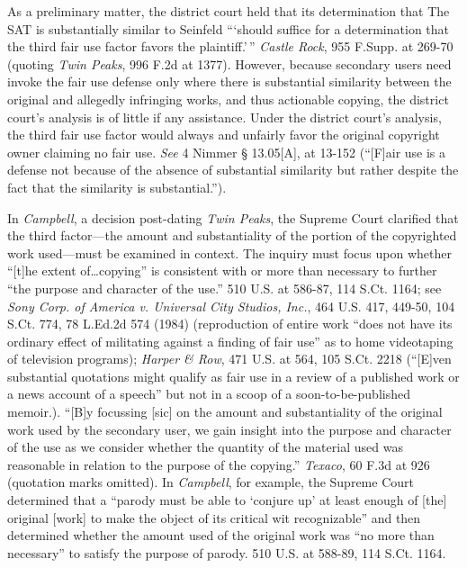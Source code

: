 
As a preliminary matter, the district court held that its determination that The
SAT is substantially similar to Seinfeld ```should suffice for
a determination that the third fair use factor favors the plaintiff.'\,''
\emph{Castle Rock}, 955 F.Supp. at 269-70 (quoting \emph{Twin Peaks}, 996 F.2d
at 1377).
However, because secondary users need invoke the fair use defense only where
there is substantial similarity between the original and allegedly infringing
works, and thus actionable copying, the district court's analysis is of little
if any assistance. Under the district court's analysis, the third fair use
factor would always and unfairly favor the original copyright owner claiming no
fair use. \emph{See} 4 Nimmer {\S} 13.05[A], at 13-152 (``[F]air use is a
defense not
because of the absence of substantial similarity but rather despite the fact
that the similarity is substantial.'').

In \emph{Campbell}, a decision post-dating \emph{Twin Peaks}, the Supreme Court
clarified that
the third factor---the amount and substantiality of the portion of the
copyrighted work used---must be examined in context. The inquiry must focus
upon whether ``[t]he extent of\ldots copying'' is consistent with or more than
necessary to further ``the purpose and character of the use.'' 510 U.S. at
586-87, 114 S.Ct. 1164; see \emph{Sony Corp. of America v. Universal City
Studios, Inc.}, 464 U.S. 417, 449-50, 104 S.Ct. 774, 78 L.Ed.2d 574 (1984)
(reproduction
of entire work ``does not have its ordinary effect of militating against a
finding of fair use'' as to home videotaping of television programs);
\emph{Harper \&
Row}, 471 U.S. at 564, 105 S.Ct. 2218 (``[E]ven substantial quotations might
qualify as fair use in a review of a published work or a news account of a
speech'' but not in a scoop of a soon-to-be-published memoir.). ``[B]y
focussing [sic] on the amount and substantiality of the original work used by
the secondary user, we gain insight into the purpose and character of the use
as we consider whether the quantity of the material used was reasonable in
relation to the purpose of the copying.'' \emph{Texaco}, 60 F.3d at 926 (quotation
marks omitted). In \emph{Campbell}, for example, the Supreme Court determined
that a
``parody must be able to `conjure up' at least enough of [the]
original [work] to make the object of its critical wit recognizable'' and then
determined whether the amount used of the original work was ``no more than
necessary'' to satisfy the purpose of parody. 510 U.S. at 588-89, 114 S.Ct.
1164.

